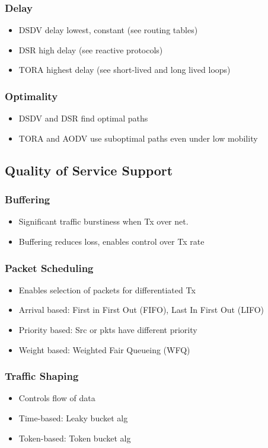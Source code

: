 \documentclass[a4paper]{article}
\begin{document}
\subsubsection{Delay}
\begin{itemize}
	\item DSDV delay lowest, constant (see routing tables)
	\item DSR high delay (see reactive protocols)
	\item TORA highest delay (see short-lived and long lived loops)
\end{itemize}
\subsubsection{Optimality}
\begin{itemize}
	\item DSDV and DSR find optimal paths
	\item TORA and AODV use suboptimal paths even under low mobility
\end{itemize}
\subsection{Quality of Service Support}
\subsubsection{Buffering}
\begin{itemize}
	\item Significant traffic burstiness when Tx over net.
	\item Buffering reduces loss, enables control over Tx rate
\end{itemize}
\subsubsection{Packet Scheduling}
\begin{itemize}
	\item Enables selection of packets for differentiated Tx
	\item Arrival based: First in First Out (FIFO), Last In First Out (LIFO)
	\item Priority based: Src or pkts have different priority
	\item Weight based: Weighted Fair Queueing (WFQ)
\end{itemize}
\subsubsection{Traffic Shaping}
\begin{itemize}
	\item Controls flow of data
	\item Time-based: Leaky bucket alg
	\item Token-based: Token bucket alg
\end{itemize}
\end{document}
